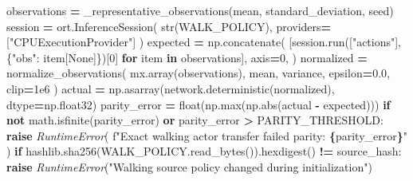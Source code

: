 \documentclass[
  american,
  11pt,
  letterpaper,
]{article}
\newenvironment{Shaded}{\begin{snugshade}}{\end{snugshade}}
\newcommand{\BuiltInTok}[1]{#1}
\newcommand{\ControlFlowTok}[1]{\textcolor[rgb]{0.13,0.29,0.53}{\textbf{#1}}}
\newcommand{\DecValTok}[1]{\textcolor[rgb]{0.00,0.00,0.81}{#1}}
\newcommand{\FloatTok}[1]{\textcolor[rgb]{0.00,0.00,0.81}{#1}}
\newcommand{\KeywordTok}[1]{\textcolor[rgb]{0.13,0.29,0.53}{\textbf{#1}}}
\newcommand{\NormalTok}[1]{#1}
\newcommand{\OperatorTok}[1]{\textcolor[rgb]{0.81,0.36,0.00}{\textbf{#1}}}
\newcommand{\PreprocessorTok}[1]{\textcolor[rgb]{0.56,0.35,0.01}{\textit{#1}}}
\newcommand{\SpecialCharTok}[1]{\textcolor[rgb]{0.81,0.36,0.00}{\textbf{#1}}}
\newcommand{\SpecialStringTok}[1]{\textcolor[rgb]{0.31,0.60,0.02}{#1}}
\newcommand{\StringTok}[1]{\textcolor[rgb]{0.31,0.60,0.02}{#1}}
\newcommand{\VariableTok}[1]{\textcolor[rgb]{0.00,0.00,0.00}{#1}}
\renewenvironment{Shaded}{\par\smallskip}{\par\smallskip}
\begin{document}
\begin{Shaded}
\begin{Highlighting}[]
\NormalTok{    observations }\OperatorTok{=}\NormalTok{ \_representative\_observations(mean, standard\_deviation, seed)}
\NormalTok{    session }\OperatorTok{=}\NormalTok{ ort.InferenceSession(}
        \BuiltInTok{str}\NormalTok{(WALK\_POLICY), providers}\OperatorTok{=}\NormalTok{[}\StringTok{"CPUExecutionProvider"}\NormalTok{]}
\NormalTok{    )}
\NormalTok{    expected }\OperatorTok{=}\NormalTok{ np.concatenate(}
\NormalTok{        [session.run([}\StringTok{"actions"}\NormalTok{], \{}\StringTok{"obs"}\NormalTok{: item[}\VariableTok{None}\NormalTok{]\})[}\DecValTok{0}\NormalTok{] }\ControlFlowTok{for}\NormalTok{ item }\KeywordTok{in}\NormalTok{ observations],}
\NormalTok{        axis}\OperatorTok{=}\DecValTok{0}\NormalTok{,}
\NormalTok{    )}
\NormalTok{    normalized }\OperatorTok{=}\NormalTok{ normalize\_observations(}
\NormalTok{        mx.array(observations), mean, variance, epsilon}\OperatorTok{=}\FloatTok{0.0}\NormalTok{, clip}\OperatorTok{=}\FloatTok{1e6}
\NormalTok{    )}
\NormalTok{    actual }\OperatorTok{=}\NormalTok{ np.asarray(network.deterministic(normalized), dtype}\OperatorTok{=}\NormalTok{np.float32)}
\NormalTok{    parity\_error }\OperatorTok{=} \BuiltInTok{float}\NormalTok{(np.}\BuiltInTok{max}\NormalTok{(np.}\BuiltInTok{abs}\NormalTok{(actual }\OperatorTok{{-}}\NormalTok{ expected)))}
    \ControlFlowTok{if} \KeywordTok{not}\NormalTok{ math.isfinite(parity\_error) }\KeywordTok{or}\NormalTok{ parity\_error }\OperatorTok{\textgreater{}}\NormalTok{ PARITY\_THRESHOLD:}
        \ControlFlowTok{raise} \PreprocessorTok{RuntimeError}\NormalTok{(}
            \SpecialStringTok{f"Exact walking actor transfer failed parity: }\SpecialCharTok{\{}\NormalTok{parity\_error}\SpecialCharTok{\}}\SpecialStringTok{"}
\NormalTok{        )}
    \ControlFlowTok{if}\NormalTok{ hashlib.sha256(WALK\_POLICY.read\_bytes()).hexdigest() }\OperatorTok{!=}\NormalTok{ source\_hash:}
        \ControlFlowTok{raise} \PreprocessorTok{RuntimeError}\NormalTok{(}\StringTok{"Walking source policy changed during initialization"}\NormalTok{)}


\end{Highlighting}
\end{Shaded}
\end{document}
